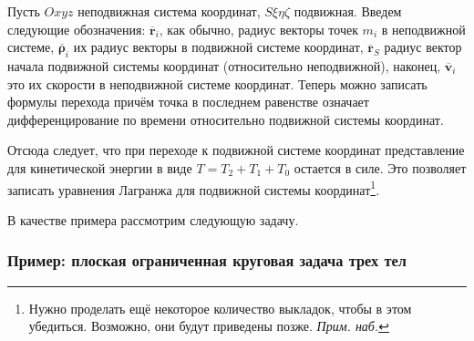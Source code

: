 \documentclass[a4paper,12pt]{article}
\newcommand{\vb}[1]{\mathbf{\overline{#1}}}
\newcommand{\vd}[1]{\dot{\mathbf{\overline{#1}}}}
\newcommand{\vpr}[2]{\hs{#1 \times #2}}
\begin{document}
Пусть $Oxyz$ неподвижная система координат, $S\xi\eta\zeta$
подвижная. Введем следующие обозначения: $\vb{r}_i$, как обычно, радиус векторы
точек $m_i$  в неподвижной системе,
$\vb{\rho}_i$ их радиус векторы в подвижной системе координат,
$\vb{r}_S$ радиус вектор начала подвижной системы координат
(относительно неподвижной), наконец, $\vb{v}_i$ это их скорости
в неподвижной системе координат. Теперь можно записать формулы перехода
\equ{\vb{r}_i=\vb{r}_S+\vb{\rho}_i(q,t),\
\vb{v}_i=\vb{v}_S+\frac{d\vb{\rho}_i}{dt}=
\vb{v}_S+\vpr{\vb{\om}}{\vb{\rho}_i}+\vd{\rho}_i,}
причём точка в последнем равенстве означает дифференцирование по
времени относительно подвижной системы координат.

Отсюда следует, что при
переходе к подвижной системе координат представление для
кинетической энергии в виде $T=T_2+T_1+T_0$ остается в силе.
Это позволяет записать уравнения Лагранжа для подвижной системы координат\footnote{Нужно проделать ещё некоторое количество выкладок,
чтобы в этом убедиться. Возможно, они будут приведены позже. \emph{Прим. наб.}}.

В качестве примера рассмотрим следующую задачу.

\subsubsection{Пример: плоская ограниченная круговая задача трех тел}

\label{sssec:three-solid-problem}
\end{document}
